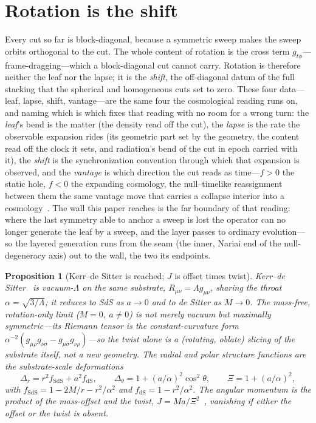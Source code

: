 \documentclass[11pt,a4paper]{article}
\newtheorem{proposition}[theorem]{Proposition}
\theoremstyle{definition}
\begin{document}
\section{Rotation is the shift}\label{sec:rotation}

Every cut so far is block-diagonal, because a symmetric sweep makes the sweep orbits orthogonal to the cut. The whole content of rotation is the cross term $g_{t\phi}$---frame-dragging---which a block-diagonal cut cannot carry. Rotation is therefore neither the leaf nor the lapse; it is the \emph{shift}, the off-diagonal datum of the full stacking that the spherical and homogeneous cuts set to zero. These four data---leaf, lapse, shift, vantage---are the same four the cosmological reading runs on, and naming which is which fixes that reading with no room for a wrong turn: the \emph{leaf}'s bend is the matter (the density read off the cut), the \emph{lapse} is the rate the observable expansion rides (its geometric part set by the geometry, the content read off the clock it sets, and radiation's bend of the cut in epoch carried with it), the \emph{shift} is the synchronization convention through which that expansion is observed, and the \emph{vantage} is which direction the cut reads as time---$f>0$ the static hole, $f<0$ the expanding cosmology, the null--timelike reassignment between them the same vantage move that carries a collapse interior into a cosmology~\cite{JanzenCRframework, JanzenCosmogenesis}. The wall this paper reaches is the far boundary of that reading: where the last symmetry able to anchor a sweep is lost the operator can no longer generate the leaf by a sweep, and the layer passes to ordinary evolution---so the layered generation runs from the seam (the inner, Nariai end of the null-degeneracy axis) out to the wall, the two its endpoints.

\begin{proposition}[Kerr--de Sitter is reached; $J$ is offset times twist]\label{prop:kerr}
Kerr--de Sitter~\cite{Kerr1963,Carter1968} is vacuum-$\Lambda$ on the same substrate, $R_{\mu\nu}=\Lambda g_{\mu\nu}$, sharing the throat $\alpha=\sqrt{3/\Lambda}$; it reduces to SdS as $a\to0$ and to de Sitter as $M\to0$. The mass-free, rotation-only limit ($M=0$, $a\neq0$) is not merely vacuum but maximally symmetric---its Riemann tensor is the constant-curvature form $\alpha^{-2}(g_{\mu\rho}g_{\nu\sigma}-g_{\mu\sigma}g_{\nu\rho})$---so the twist alone is a (rotating, oblate) slicing of the substrate itself, not a new geometry. The radial and polar structure functions are the substrate-scale deformations
\begin{equation}\label{eq:deltadecomp}
\Delta_{r}=r^{2}f_{\mathrm{SdS}}+a^{2}f_{\mathrm{dS}},\qquad
\Delta_{\theta}=1+(a/\alpha)^{2}\cos^{2}\theta,\qquad
\Xi=1+(a/\alpha)^{2},
\end{equation}
with $f_{\mathrm{SdS}}=1-2M/r-r^{2}/\alpha^{2}$ and $f_{\mathrm{dS}}=1-r^{2}/\alpha^{2}$. The angular momentum is the product of the mass-offset and the twist, $J=Ma/\Xi^{2}$~\cite{GibbonsPerryPope2005}, vanishing if either the offset or the twist is absent.
\end{proposition}
\end{document}
